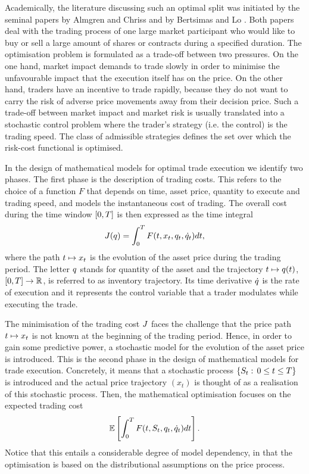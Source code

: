 \documentclass[10pt,a4paper]{article}
\begin{document}
	Academically, the literature discussing such an optimal split  was initiated by the seminal papers by Almgren and Chriss \cite{AC00opt} and by Bertsimas and Lo \cite{BL98opt}. Both papers deal with 
	the trading process of one large market participant  who would like to buy or sell a large amount of shares or contracts during a specified duration. 
	The optimisation problem is formulated as a trade-off between two pressures. On the one hand, market impact  demands to trade slowly in order to minimise the unfavourable impact that the execution itself has on the price. 
	On the other hand, traders have an incentive to trade rapidly, because they do not want to carry the risk of adverse price movements away from their decision price. Such a  trade-off between market impact and market risk is usually translated into a stochastic control problem where the trader's strategy (i.e. the control) is the trading speed. The class of admissible strategies defines  the set over which the risk-cost functional is optimised. 
	
	In the design of mathematical models for optimal trade execution we identify two phases. The first phase is the description of trading costs. This refers to the choice of a function $F$ that depends on time, asset price, quantity to execute and trading speed, and models the instantaneous cost of trading. The overall cost during the time window ${[0,T]}$ is then expressed as the time integral
	\[
	J(q) = \int_{0}^{T}
	F(t,x_t,q_t,\dot{q}_t)dt,
	\]
	where the path $t \mapsto x_t$ is the evolution of the asset price during the trading period. The letter $q$ stands for quantity of the asset and the trajectory $t\mapsto q(t)$, ${[0,T]} \rightarrow \mathbb{R}$, is referred to as inventory trajectory. Its time derivative $\dot{q}$ is the rate of execution and it represents the control variable that a trader modulates while executing the trade. 
	
	The minimisation of the trading cost $J$ faces the challenge that the price path $t \mapsto x_t$ is not known at the beginning of the trading period. Hence, in order to gain some predictive power, a stochastic model for the evolution of the asset price is introduced. This is the second phase in the design of  mathematical models for trade execution. Concretely, it means that a stochastic process $\lbrace S_t: \, 0\leq t \leq T \rbrace$ is introduced and the actual price trajectory $(x_t)$ is thought of as a realisation of this stochastic process. Then, the mathematical optimisation focuses on the expected trading cost
	\begin{equation}\label{eq.expectedTradingCost}
	\mathbb{{E}}\left[
	\int_{0}^{T} F(t,S_t, q_t,\dot{q}_{t}) dt
	\right]. 
	\end{equation}
	Notice that this entails a considerable degree of model dependency, in that the optimisation is based on the distributional assumptions on the price process. 
	
\end{document}
